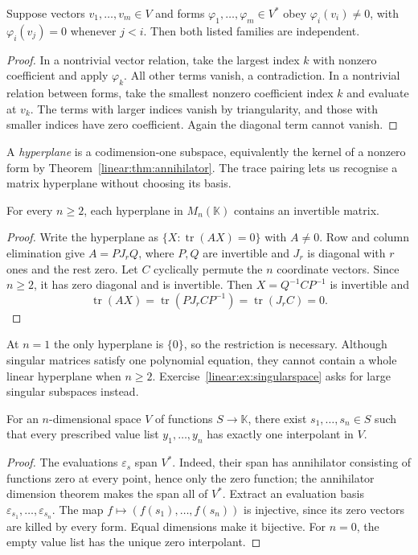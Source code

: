 \begin{proposition}\label{linear:prop:triangular}
Suppose vectors $v_1,\ldots,v_m\in V$ and forms $\varphi_1,\ldots,\varphi_m\in V^*$ obey $\varphi_i(v_i)\ne0$, with $\varphi_i(v_j)=0$ whenever $j<i$. Then both listed families are independent.
\end{proposition}
\begin{proof}
In a nontrivial vector relation, take the largest index $k$ with nonzero coefficient and apply $\varphi_k$. All other terms vanish, a contradiction. In a nontrivial relation between forms, take the smallest nonzero coefficient index $k$ and evaluate at $v_k$. The terms with larger indices vanish by triangularity, and those with smaller indices have zero coefficient. Again the diagonal term cannot vanish.
\end{proof}

A \emph{hyperplane} is a codimension-one subspace, equivalently the kernel of a nonzero form by Theorem~\ref{linear:thm:annihilator}. The trace pairing lets us recognise a matrix hyperplane without choosing its basis.

\begin{theorem}\label{linear:thm:hyperplane}
For every $n\ge2$, each hyperplane in $M_n(\mathbb K)$ contains an invertible matrix.
\end{theorem}
\begin{proof}
Write the hyperplane as $\{X:\operatorname{tr}(AX)=0\}$ with $A\ne0$. Row and column elimination give $A=PJ_rQ$, where $P,Q$ are invertible and $J_r$ is diagonal with $r$ ones and the rest zero. Let $C$ cyclically permute the $n$ coordinate vectors. Since $n\ge2$, it has zero diagonal and is invertible. Then $X=Q^{-1}CP^{-1}$ is invertible and
\[\operatorname{tr}(AX)=\operatorname{tr}(PJ_rCP^{-1})=\operatorname{tr}(J_rC)=0.
\]
\end{proof}

At $n=1$ the only hyperplane is $\{0\}$, so the restriction is necessary. Although singular matrices satisfy one polynomial equation, they cannot contain a whole linear hyperplane when $n\ge2$. Exercise~\ref{linear:ex:singularspace} asks for large singular subspaces instead.

\begin{proposition}\label{linear:prop:unisolvent}
For an $n$-dimensional space $V$ of functions $S\to\mathbb K$, there exist $s_1,\ldots,s_n\in S$ such that every prescribed value list $y_1,\ldots,y_n$ has exactly one interpolant in $V$.
\end{proposition}
\begin{proof}
The evaluations $\varepsilon_s$ span $V^*$. Indeed, their span has annihilator consisting of functions zero at every point, hence only the zero function; the annihilator dimension theorem makes the span all of $V^*$. Extract an evaluation basis $\varepsilon_{s_1},\ldots,\varepsilon_{s_n}$. The map $f\mapsto(f(s_1),\ldots,f(s_n))$ is injective, since its zero vectors are killed by every form. Equal dimensions make it bijective. For $n=0$, the empty value list has the unique zero interpolant.
\end{proof}

